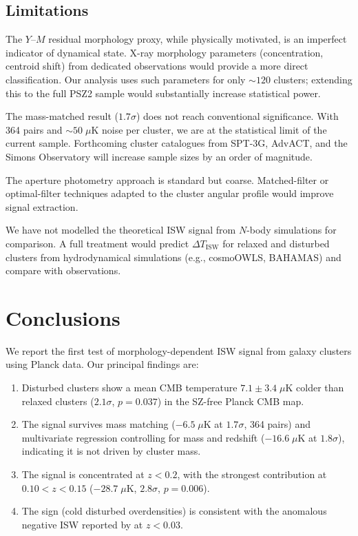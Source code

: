 \documentclass[twocolumn]{article}
\begin{document}
\subsection{Limitations}

The $Y$--$M$ residual morphology proxy, while physically
motivated, is an imperfect indicator of dynamical state.
X-ray morphology parameters (concentration, centroid shift)
from dedicated observations \citep{lovisari2017} would provide
a more direct classification.
Our analysis uses such parameters for only ${\sim}120$ clusters;
extending this to the full PSZ2 sample would substantially
increase statistical power.

The mass-matched result ($1.7\sigma$) does not reach conventional
significance.
With 364 pairs and ${\sim}50\;\mu$K noise per cluster, we are at
the statistical limit of the current sample.
Forthcoming cluster catalogues from SPT-3G, AdvACT, and the
Simons Observatory will increase sample sizes by an order of
magnitude.

The aperture photometry approach is standard but coarse.
Matched-filter or optimal-filter techniques adapted to the cluster
angular profile would improve signal extraction.

We have not modelled the theoretical ISW signal from $N$-body
simulations for comparison.
A full treatment would predict $\Delta T_{\mathrm{ISW}}$ for
relaxed and disturbed clusters from hydrodynamical simulations
(e.g., cosmoOWLS, BAHAMAS) and compare with observations.

\section{Conclusions}
\label{sec:conclusions}

We report the first test of morphology-dependent ISW signal from
galaxy clusters using Planck data.
Our principal findings are:

\begin{enumerate}[nosep]
  \item Disturbed clusters show a mean CMB temperature
        $7.1 \pm 3.4\;\mu$K colder than relaxed clusters
        ($2.1\sigma$, $p = 0.037$) in the SZ-free Planck CMB map.

  \item The signal survives mass matching ($-6.5\;\mu$K at
        $1.7\sigma$, 364 pairs) and multivariate regression
        controlling for mass and redshift ($-16.6\;\mu$K at
        $1.8\sigma$), indicating it is not driven by cluster mass.

  \item The signal is concentrated at $z < 0.2$, with the
        strongest contribution at $0.10 < z < 0.15$ ($-28.7\;\mu$K,
        $2.8\sigma$, $p = 0.006$).

  \item The sign (cold disturbed overdensities) is consistent with
        the anomalous negative ISW reported by \citet{hansen2026}
        at $z < 0.03$.
\end{enumerate}
\end{document}
